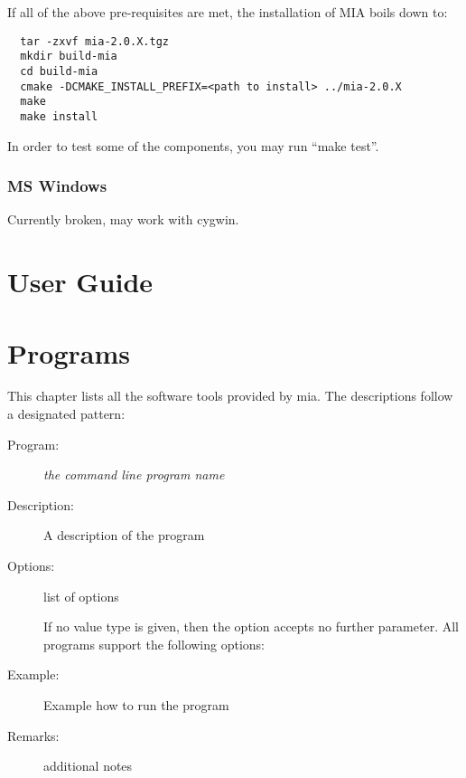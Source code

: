 \documentclass[english, 10pt, a4paper,headsepline,openany]{scrbook}
\begin{document}
If all of the above pre-requisites are met, the installation of MIA boils down to:

\lstset{language=bash}
\begin{lstlisting}
  tar -zxvf mia-2.0.X.tgz
  mkdir build-mia
  cd build-mia
  cmake -DCMAKE_INSTALL_PREFIX=<path to install> ../mia-2.0.X
  make
  make install
\end{lstlisting}
In order to test some of the components, you may run ``make test''. 

\subsection{MS Windows} 

Currently broken, may work with cygwin. 

\chapter{User Guide}



\chapter{Programs}
\label{ch:prog}


This chapter lists all the software tools provided by mia. 
The descriptions follow a designated pattern: 

\begin{description}
\item [Program:]\emph{the command line program name}
\item [Description:]A description of the program
\item [Options:] list of options

\noindent 
{}

\noindent 
If no value type is given, then the option accepts no further parameter. 
All programs support the following options: 


\item [Example:] Example how to run the program 

\item [Remarks:] additional notes
\end{description}
\end{document}
